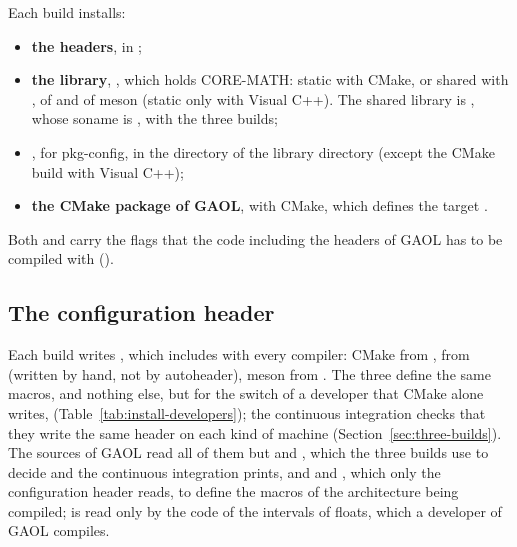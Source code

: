 \documentclass[12pt,a4paper,twoside,openright]{book}
\begin{document}
Each build installs:
\begin{itemize}
\item[$\bullet$] \textbf{the headers}, in ;
\item[$\bullet$] \textbf{the library}, , which holds CORE-MATH:
  static with CMake, or shared with ,
   of  and
   of meson (static only with Visual C++).
  The shared library is , whose soname is
  , with the three builds;
\item[$\bullet$] \textbf{}, for pkg-config, in the
   directory of the library directory (except the CMake build
  with Visual C++);
\item[$\bullet$] \textbf{the CMake package of GAOL}, with CMake, which defines
  the target .
\end{itemize}

\noindent
Both  and  carry the flags that the code
including the headers of GAOL has to be compiled with ().

\subsection{The configuration header}\label{sec:install-configuration-header}
%

Each build writes , which
 includes with every compiler: CMake from
,  from
 (written by hand, not by autoheader),
meson from . The three define the
same macros, and nothing else, but for the switch of a developer that CMake
alone writes, 
(Table~\ref{tab:install-developers}); the continuous integration checks that
they write the same header on each kind of machine
(Section~\ref{sec:three-builds}).\newinvfive{} The sources of GAOL read all
of them but  and ,
which the three builds use to decide  and the
continuous integration prints, and  and
, which only the configuration header reads, to
define the macros of the architecture being compiled;
 is read only by the code of the
intervals of floats, which a developer of GAOL compiles.
\end{document}
